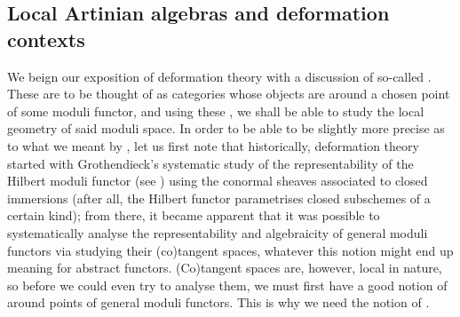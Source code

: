         \subsection{Local Artinian algebras and deformation contexts}
            We beign our exposition of deformation theory with a discussion of so-called . These are to be thought of as categories whose objects are  around a chosen point of some moduli functor, and using these , we shall be able to study the local geometry of said moduli space. In order to be able to be slightly more precise as to what we meant by , let us first note that historically, deformation theory started with Grothendieck's systematic study of the representability of the Hilbert moduli functor (see \cite{grothendieck_fga_2}) using the conormal sheaves associated to closed immersions (after all, the Hilbert functor parametrises closed subschemes of a certain kind); from there, it became apparent that it was possible to systematically analyse the representability and algebraicity of general moduli functors via studying their (co)tangent spaces, whatever this notion might end up meaning for abstract functors. (Co)tangent spaces are, however, local in nature, so before we could even try to analyse them, we must first have a good notion of  around points of general moduli functors. This is why we need the notion of .
            
